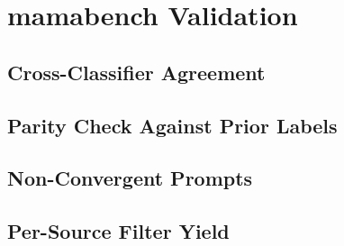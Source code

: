 \section{mamabench Validation}

\subsection{Cross-Classifier Agreement}

\subsection{Parity Check Against Prior Labels}

\subsection{Non-Convergent Prompts}

\subsection{Per-Source Filter Yield}

